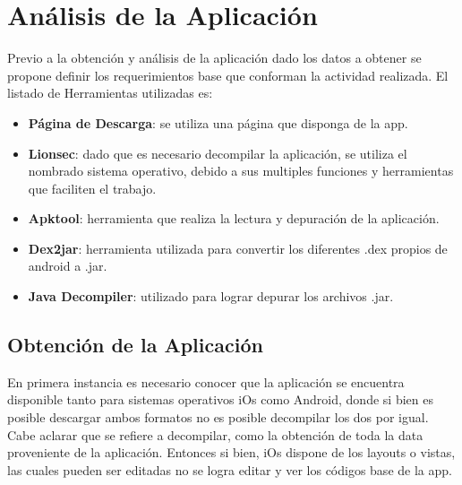 \documentclass[a4paper,11pt]{article}
\theoremstyle{mytheor}
\begin{document}
\section{Análisis de la Aplicación}
Previo a la obtención y análisis de la aplicación dado los datos a obtener se propone definir los requerimientos base que conforman la actividad realizada. El listado de Herramientas utilizadas es:

\begin{itemize}
    \item \textbf{Página de Descarga}: se utiliza una página que disponga de la app.
    \item \textbf{Lionsec}: dado que es necesario decompilar la aplicación, se utiliza el nombrado sistema operativo, debido a sus multiples funciones y herramientas que faciliten el trabajo.
    \item \textbf{Apktool}: herramienta que realiza la lectura y depuración de la aplicación.
    \item \textbf{Dex2jar}: herramienta utilizada para convertir los diferentes .dex propios de android a .jar.
    \item \textbf{Java Decompiler}: utilizado para lograr depurar los archivos .jar.
\end{itemize}

\subsection{Obtención de la Aplicación}
En primera instancia es necesario conocer que la aplicación se encuentra disponible tanto para sistemas operativos iOs como Android, donde si bien es posible descargar ambos formatos no es posible decompilar los dos por igual. Cabe aclarar que se refiere a decompilar, como la obtención de toda la data proveniente de la aplicación. Entonces si bien, iOs dispone de los layouts o vistas, las cuales pueden ser editadas no se logra editar y ver los códigos base de la app. 
\end{document}
